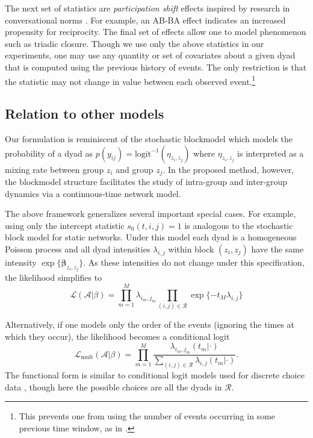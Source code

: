\documentclass[11pt]{article}
\begin{document}
The next set of statistics are \emph{participation shift} effects inspired by research in conversational norms \cite{Gibson2003}.  For example, an AB-BA effect indicates an increased propensity for reciprocity.  The final set of effects allow one to model phenomenon such as triadic closure.  Though we use only the above statistics in our experiments, one may use any quantity or set of covariates about a given dyad that is computed using the previous history of events.  The only restriction is that the statistic may not change in value between each observed event.\footnote{This prevents one from using the number of events occurring in some previous time window, as in \cite{Gunawardana2011}.}

\subsection{Relation to other models}

Our formulation is reminiscent of the stochastic blockmodel \cite{Nowicki2001,Kemp} which models the probability of a dyad as $p(y_{ij}) =\mbox{logit}^{-1}( \eta_{z_i,z_j})$ where $\eta_{z_i,z_j}$ is interpreted as a mixing rate between group $z_i$ and group $z_j$.  In the proposed method, however, the blockmodel structure facilitates the study of intra-group and inter-group dynamics via a continuous-time network model.

The above framework generalizes several important special cases. For example,  using only the intercept statistic $s_0(t,i,j) = 1$ is analogous to the stochastic block model for static networks.  Under this model each dyad is a homogeneous Poisson process and all dyad intensities $\lambda_{i,j}$ within block $(z_i,z_j)$ have the same intensity $\exp\{\boldsymbol{\beta}_{z_i,z_j}\}$.  As these intensities do not change under this specification, the likelihood simplifies to 
$$\mathcal{L}(\mathcal{A}|\beta) = \prod_{m=1}^M \lambda_{i_m,j_m} \prod_{(i,j) \in \mathcal{R}} \exp\{-t_M \lambda_{i,j}\}$$

Alternatively, if one models only the order of the events (ignoring the times at which they occur), the likelihood becomes a conditional logit
$$\mathcal{L}_{\mbox{mult}}(\mathcal{A}|\beta) = \prod_{m=1}^M \frac{\lambda_{i_m,j_m}(t_m | \cdot)}{\sum_{(i,j) \in \mathcal{R}} \lambda_{i,j}(t_m | \cdot)}.$$
The functional form is similar to conditional logit models used for discrete choice data \cite{McFadden1984}, though here the possible choices are all the dyads in $\mathcal{R}$.
\end{document}
